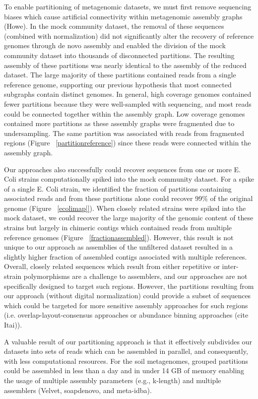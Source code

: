 \documentclass[11pt]{article} %
\begin{document}
To enable partitioning of metagenomic datasets, we must first remove sequencing biases which cause artificial connectivity within metagenomic assembly graphs (Howe).  In the mock community dataset, the removal of these sequences (combined with normalization) did not significantly alter the recovery of reference genomes through de novo assembly and enabled the division of the mock community dataset into thousands of disconnected partitions.  The resulting assembly of these partitions was nearly identical to the assembly of the reduced dataset.  The large majority of these partitions  contained reads from a single reference genome, supporting our previous hypothesis that most connected subgraphs contain distinct genomes.  In general, high coverage genomes contained fewer partitions because they were well-sampled with sequencing, and most reads could be connected together within the assembly graph.  Low coverage genomes contained more partitions as these assembly graphs were fragmented due to undersampling.  The same partition was associated with reads from fragmented regions (Figure ~\ref{partitionreference}) since these reads were connected within the assembly graph.  

Our approaches also successfully could recover sequences from one or more E. Coli strains computationally spiked into the mock community dataset.  For a spike of a single E. Coli strain, we identified the fraction of partitions containing associated reads and from these partitions alone could recover 99\% of the original genome (Figure ~\ref{ecolimap|}).  When closely related strains were spiked into the mock dataset, we could recover the large majority of the genomic content of these strains but largely in chimeric contigs which contained reads from multiple reference genomes (Figure ~\ref{fractionassembled}).  However, this result is not unique to our approach as assemblies of the unfiltered dataset resulted in a slightly higher fraction of assembled contigs associated with multiple references.  Overall, closely related sequences which result from either repetitive or inter-strain polymorphisms are a challenge to assemblers, and our approaches are not specifically designed to target such regions.  However, the partitions resulting from our approach (without digital normalization) could provide a subset of sequences which could be targeted for more sensitive assembly approaches for such regions (i.e. overlap-layout-consensus approaches or abundance binning approaches (cite Itai)).  

A valuable result of our partitioning approach is that it effectively subdivides our datasets into sets of reads which can be assembled in parallel, and consequently, with less computational resources.  For the soil metagenomes, grouped partitions could be assembled in less than a day and in under 14 GB of memory enabling the usage of multiple assembly parameters (e.g., k-length) and multiple assemblers (Velvet, soapdenovo, and meta-idba).
\end{document}
